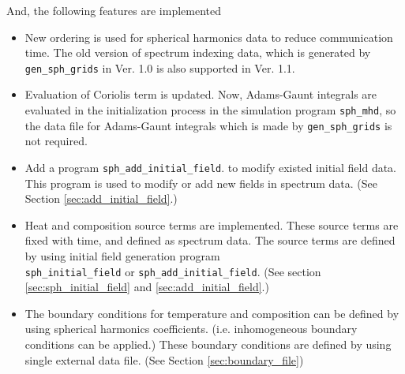 And, the following features are implemented
\begin{itemize}
\item New ordering is used for spherical harmonics data to reduce communication time. The old version of spectrum indexing data, which is generated by \verb|gen_sph_grids| in Ver. 1.0 is also supported in Ver. 1.1.
\item Evaluation of Coriolis term is updated. Now, Adams-Gaunt integrals are evaluated in the initialization process in the simulation program \verb|sph_mhd|, so the data file for Adams-Gaunt integrals which is made by \verb|gen_sph_grids|  is not required.
\item Add a program \verb|sph_add_initial_field|. to modify existed initial field data. This program is used to modify or add new fields in spectrum data. (See Section \ref{sec:add_initial_field}.)
\item Heat and composition source terms are implemented. These source terms are fixed with time, and defined as spectrum data. The source terms are defined by using initial field generation program \\ \verb|sph_initial_field| or \verb|sph_add_initial_field|. (See section \ref{sec:sph_initial_field} and  \ref{sec:add_initial_field}.)
\item The boundary conditions for temperature and composition can be defined by using spherical harmonics coefficients. (i.e. inhomogeneous boundary conditions can be applied.) These boundary conditions are defined by using single external data file. (See Section \ref{sec:boundary_file})
\end{itemize}

%
